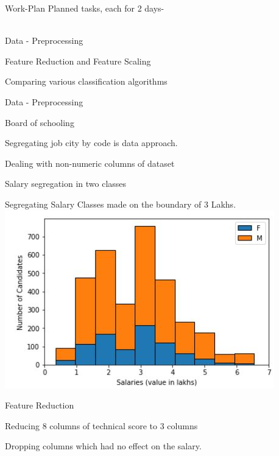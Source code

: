 \documentclass[14pt]{beamer}
\begin{document}
\begin{frame}{Work-Plan}
\pause
Planned tasks, each for 2 days- 
\\~\
\renewcommand{\labelitemi}{$\square $}
 \begin{fullpageitemize}
  \item Data - Preprocessing
  \item Feature Reduction and Feature Scaling 
  \item Comparing various classification algorithms 
 \end{fullpageitemize}
\end{frame}
\begin{frame}{Data - Preprocessing}
\pause
\renewcommand{\labelitemi}{$\square$}
 \begin{fullpageitemize}
  \item Board of schooling
  \item Segregating job city by code is data approach. 
  \item Dealing with non-numeric columns of dataset
  \item Salary segregation in two classes
 \end{fullpageitemize}
\end{frame}
\begin{frame}{Segregating Salary}
Classes made on the boundary of 3 Lakhs.
\pause
\includegraphics[]{salaryDistribution.JPG}
\end{frame}
\begin{frame}{Feature Reduction}
\pause
\renewcommand{\labelitemi}{$\square$}
 \begin{fullpageitemize}
  \item Reducing 8 columns of  technical score to 3 columns
  \item Dropping columns which had no effect on the salary.
 \end{fullpageitemize}
\end{frame}
\end{document}
